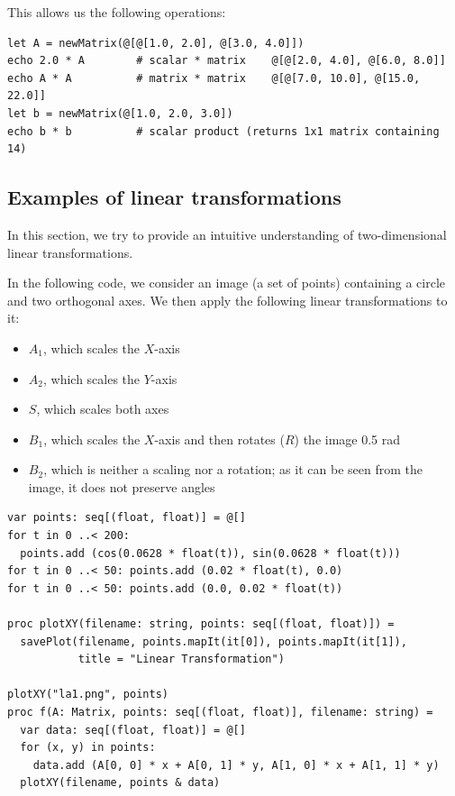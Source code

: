 \documentclass[justified, sixbynine]{tufte-book}
\theoremstyle{plain}%
\newtheorem * {corollary}{Corollary}
\theoremstyle{definition}
\theoremstyle{remark}
\newtheorem * {remark}{Remark}
\newtheorem * {note}{Note}
\begin{document}
\begin{fullwidth}
This allows us the following operations:
\begin{lstlisting}
let A = newMatrix(@[@[1.0, 2.0], @[3.0, 4.0]])
echo 2.0 * A        # scalar * matrix    @[@[2.0, 4.0], @[6.0, 8.0]]
echo A * A          # matrix * matrix    @[@[7.0, 10.0], @[15.0, 22.0]]
let b = newMatrix(@[1.0, 2.0, 3.0])
echo b * b          # scalar product (returns 1x1 matrix containing 14)
\end{lstlisting}


\goodbreak\subsection{Examples of linear transformations}


In this section, we try to provide an intuitive understanding of two-dimensional linear transformations.

In the following code, we consider an image (a set of points) containing a circle and two orthogonal axes. We then apply the following linear transformations to it:
\begin{itemize}
\item $A_1$, which scales the $X$-axis
\item $A_2$, which scales the $Y$-axis
\item $S$, which scales both axes
\item $B_1$, which scales the $X$-axis and then rotates ($R$) the image 0.5 rad
\item $B_2$, which is neither a scaling nor a rotation; as it can be seen from the image, it does not preserve angles
\end{itemize}

\begin{lstlisting}
var points: seq[(float, float)] = @[]
for t in 0 ..< 200:
  points.add (cos(0.0628 * float(t)), sin(0.0628 * float(t)))
for t in 0 ..< 50: points.add (0.02 * float(t), 0.0)
for t in 0 ..< 50: points.add (0.0, 0.02 * float(t))

proc plotXY(filename: string, points: seq[(float, float)]) =
  savePlot(filename, points.mapIt(it[0]), points.mapIt(it[1]),
           title = "Linear Transformation")

plotXY("la1.png", points)
proc f(A: Matrix, points: seq[(float, float)], filename: string) =
  var data: seq[(float, float)] = @[]
  for (x, y) in points:
    data.add (A[0, 0] * x + A[0, 1] * y, A[1, 0] * x + A[1, 1] * y)
  plotXY(filename, points & data)


\end{lstlisting}
\end{fullwidth}
\end{document}
